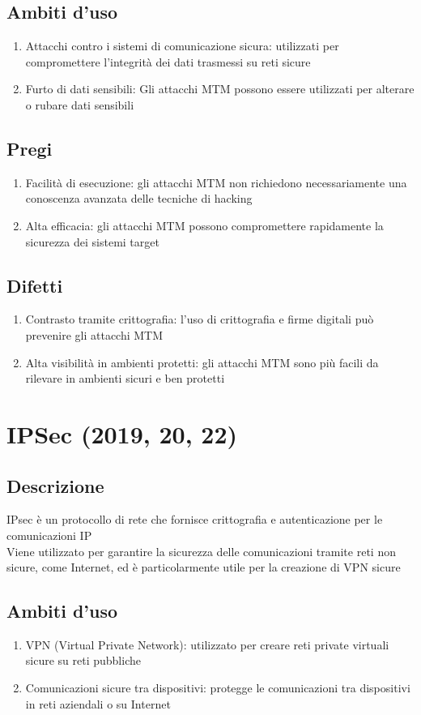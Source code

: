 \documentclass[10pt,oneside,a4paper]{article}
\begin{document}
\begin{enumerate}
\subsection{Ambiti d'uso}
\begin{enumerate}
\item Attacchi contro i sistemi di comunicazione sicura: utilizzati per compromettere l'integrità dei dati trasmessi su reti sicure
\item Furto di dati sensibili: Gli attacchi MTM possono essere utilizzati per alterare o rubare dati sensibili
\end{enumerate}
\subsection{Pregi}
\begin{enumerate}
\item Facilità di esecuzione: gli attacchi MTM non richiedono necessariamente una conoscenza avanzata delle tecniche di hacking
\item Alta efficacia: gli attacchi MTM possono compromettere rapidamente la sicurezza dei sistemi target
\end{enumerate}
\subsection{Difetti}
\begin{enumerate}
\item Contrasto tramite crittografia: l'uso di crittografia e firme digitali può prevenire gli attacchi MTM
\item Alta visibilità in ambienti protetti: gli attacchi MTM sono più facili da rilevare in ambienti sicuri e ben protetti
\end{enumerate}
\section{IPSec (2019, 20, 22)}
\subsection{Descrizione}
IPsec è un protocollo di rete che fornisce crittografia e autenticazione per le comunicazioni IP\\
Viene utilizzato per garantire la sicurezza delle comunicazioni tramite reti non sicure, come Internet, ed è particolarmente utile per la creazione di VPN sicure
\subsection{Ambiti d'uso}
\begin{enumerate}
\item VPN (Virtual Private Network): utilizzato per creare reti private virtuali sicure su reti pubbliche
\item Comunicazioni sicure tra dispositivi: protegge le comunicazioni tra dispositivi in reti aziendali o su Internet
\end{enumerate}

\end{enumerate}
\end{document}

